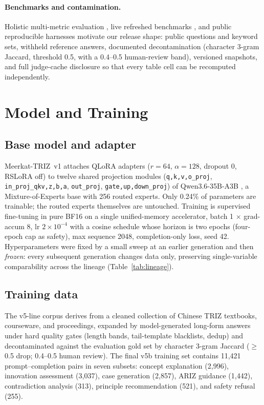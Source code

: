 \documentclass[11pt]{article}
\newcommand{\model}{Meerkat-TRIZ}
\begin{document}
\paragraph{Benchmarks and contamination.}
Holistic multi-metric evaluation \cite{helm}, live refreshed benchmarks
\cite{livebench}, and public reproducible harnesses motivate our
release shape: public questions and keyword sets, withheld reference
answers, documented decontamination (character 3-gram Jaccard,
threshold 0.5, with a 0.4--0.5 human-review band), versioned snapshots,
and full judge-cache disclosure so that every table cell can be
recomputed independently.

\section{Model and Training}
\label{sec:model}

\subsection{Base model and adapter}
\model~v1 attaches QLoRA adapters \cite{lora,qlora} ($r{=}64$,
$\alpha{=}128$, dropout 0, RSLoRA off) to twelve shared projection
modules (\texttt{q,k,v,o\_proj}, \texttt{in\_proj\_qkv,z,b,a},
\texttt{out\_proj}, \texttt{gate,up,down\_proj}) of Qwen3.6-35B-A3B
\cite{qwen3}, a
Mixture-of-Experts base with 256 routed experts. Only 0.24\% of
parameters are trainable; the routed experts themselves are untouched.
Training is supervised fine-tuning \cite{instructgpt} in pure BF16 on a single
unified-memory accelerator, batch 1
$\times$ grad-accum 8, lr $2{\times}10^{-4}$ with a cosine schedule
whose horizon is two epochs (four-epoch cap as safety), max sequence
2048, completion-only loss, seed 42. Hyperparameters were fixed by a
small sweep at an earlier generation and then \emph{frozen}: every
subsequent generation changes data only, preserving single-variable
comparability across the lineage (Table~\ref{tab:lineage}).

\subsection{Training data}
The v5-line corpus derives from a cleaned collection of Chinese TRIZ
textbooks, courseware, and proceedings, expanded by model-generated
long-form answers under hard quality gates (length bands, tail-template
blacklists, dedup) and decontaminated against the evaluation gold set by
character 3-gram Jaccard ($\geq$0.5 drop; 0.4--0.5 human review).
The final v5b training set contains 11{,}421 prompt--completion pairs in
seven subsets: concept explanation (2{,}996), innovation assessment
(3{,}037), case generation (2{,}857), ARIZ guidance (1{,}442),
contradiction analysis (313), principle recommendation (521), and
safety refusal (255).
\end{document}
